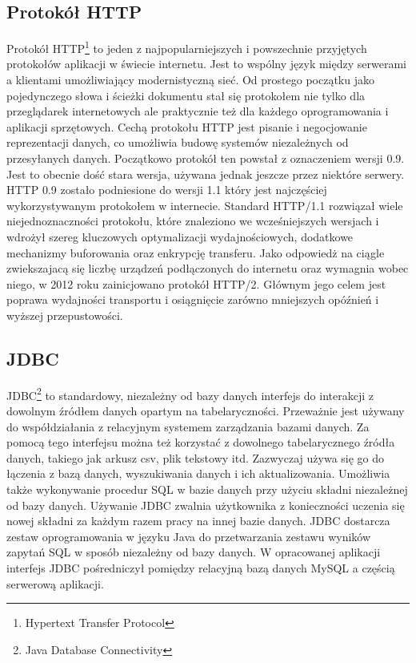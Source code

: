 \documentclass[12pt, twoside]{report}
\begin{document}
\subsection{Protokół HTTP}
Protokół HTTP\footnote{Hypertext Transfer Protocol} to jeden z najpopularniejszych i powszechnie przyjętych protokołów aplikacji w świecie internetu. Jest to wspólny język między serwerami a klientami umożliwiający modernistyczną sieć. Od prostego początku jako pojedynczego słowa i ścieżki dokumentu stał się protokołem nie tylko dla przeglądarek internetowych ale praktycznie też dla każdego oprogramowania i aplikacji sprzętowych\cite{http}. Cechą protokołu HTTP jest pisanie i negocjowanie reprezentacji danych, co umożliwia budowę systemów niezależnych od przesyłanych danych.
 Początkowo protokół ten powstał z oznaczeniem wersji 0.9. Jest to obecnie dość stara wersja, używana jednak jeszcze przez niektóre serwery. HTTP 0.9 zostało podniesione do wersji 1.1 który jest najczęściej wykorzystywanym protokołem w internecie. Standard HTTP/1.1 rozwiązał wiele niejednoznaczności protokołu, które znaleziono we wcześniejszych wersjach i wdrożył szereg kluczowych optymalizacji wydajnościowych, dodatkowe mechanizmy buforowania oraz enkrypcję transferu. Jako odpowiedż na ciągle zwiekszajacą się liczbę urządzeń podłączonych do internetu oraz wymagnia wobec niego, w 2012 roku zainicjowano protokół HTTP/2. Głównym jego celem jest poprawa wydajności transportu i osiągnięcie zarówno mniejszych opóźnień i wyższej przepustowości.
\subsection{JDBC}
JDBC\footnote{Java Database Connectivity} to standardowy, niezależny od bazy danych interfejs do interakcji z dowolnym źródłem danych opartym na tabelaryczności. Przeważnie jest używany do współdziałania z relacyjnym systemem zarządzania bazami danych. Za pomocą tego interfejsu można też korzystać z dowolnego tabelarycznego źródła danych, takiego jak arkusz csv, plik tekstowy itd. Zazwyczaj używa się go do łączenia z bazą danych, wyszukiwania danych i ich aktualizowania. Umożliwia także wykonywanie procedur SQL w bazie danych przy użyciu składni niezależnej od bazy danych.\cite{jdbc} Używanie JDBC zwalnia użytkownika z konieczności uczenia się nowej składni za każdym razem pracy na innej bazie danych. JDBC dostarcza zestaw oprogramowania w języku Java do przetwarzania zestawu wyników zapytań SQL w sposób niezależny od bazy danych. W opracowanej aplikacji interfejs JDBC pośredniczył pomiędzy relacyjną bazą danych MySQL a częścią serwerową aplikacji.
\end{document}
